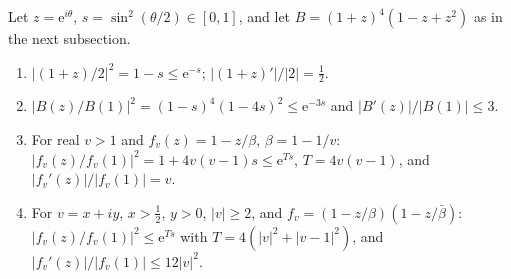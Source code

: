 \documentclass[11pt]{article}
\theoremstyle{remark}\newtheorem{remark}[theorem]{Remark}
\newcommand{\ee}{\mathrm e}
\begin{document}
\begin{lemmaS}\label{lem:factors}
Let \(z=\ee^{i\theta}\), \(s=\sin^2(\theta/2)\in[0,1]\), and let
\(B=(1+z)^4(1-z+z^2)\) as in the next subsection.
\begin{enumerate}
\item[(a)] \(|(1+z)/2|^2=1-s\le\ee^{-s}\); \(|(1+z)'|/|2|=\tfrac12\).
\item[(b)] \(|B(z)/B(1)|^2=(1-s)^4(1-4s)^2\le\ee^{-3s}\) and
\(|B'(z)|/|B(1)|\le3\).
\item[(c)] For real \(v>1\) and \(f_v(z)=1-z/\beta\), \(\beta=1-1/v\):
\(|f_v(z)/f_v(1)|^2=1+4v(v-1)s\le\ee^{T s}\), \(T=4v(v-1)\), and
\(|f_v'(z)|/|f_v(1)|=v\).
\item[(d)] For \(v=x+iy\), \(x>\tfrac12\), \(y>0\), \(|v|\ge2\), and
\(f_v=(1-z/\beta)(1-z/\bar\beta)\): \(|f_v(z)/f_v(1)|^2\le\ee^{Ts}\) with
\(T=4(|v|^2+|v-1|^2)\), and \(|f_v'(z)|/|f_v(1)|\le12|v|^2\).
\end{enumerate}
\end{lemmaS}
\end{document}
